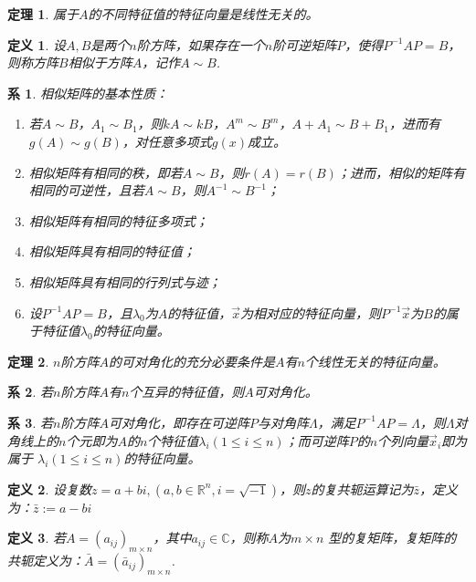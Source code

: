 \documentclass[a4paper]{book}
\newtheorem{Def}{定义}[chapter]
\newtheorem{cor}{系}[chapter]
\newtheorem{thm}{定理}[chapter]
\begin{document}
\begin{thm}
属于$A$的不同特征值的特征向量是线性无关的。
\end{thm}

\begin{Def}
设$A,B$是两个$n$阶方阵，如果存在一个$n$阶可逆矩阵$P$，使得$P^{-1}AP=B$，
则称方阵$B$相似于方阵$A$，记作$A\sim B$.
\end{Def}

\begin{cor}
相似矩阵的基本性质：
\begin{enumerate}
  \item 若$A\sim B$，$A_1\sim B_1$，则$kA\sim kB$，$A^m\sim B^m$，$A+A_1\sim B+B_1$，进而有$g(A)\sim g(B)$，对任意多项式$g(x)$成立。
  \item 相似矩阵有相同的秩，即若$A\sim B$，则$r(A)=r(B)$；进而，相似的矩阵有
  相同的可逆性，且若$A\sim B$，则$A^{-1}\sim B^{-1}$；
  \item 相似矩阵有相同的特征多项式；
  \item 相似矩阵具有相同的特征值；
  \item 相似矩阵具有相同的行列式与迹；
  \item 设$P^{-1}AP=B$，且$\lambda_0$为$A$的特征值，$\vec{x}$为相对应的特征向量，则$P^{-1}\vec{x}$为$B$的属于特征值$\lambda_0$的特征向量。
\end{enumerate}
\end{cor}

\begin{thm}
$n$阶方阵$A$的可对角化的充分必要条件是$A$有$n$个线性无关的特征向量。
\end{thm}

\begin{cor}
若$n$阶方阵$A$有$n$个互异的特征值，则$A$可对角化。
\end{cor}

\begin{cor}
若$n$阶方阵$A$可对角化，即存在可逆阵$P$与对角阵$\Lambda$，满足$P^{-1}AP=\Lambda$，则$\Lambda$对角线上的$n$个元即为$A$的$n$个特征值$\lambda_i(1\leq i\leq n)$；而可逆阵$P$的$n$个列向量$\vec{x}_i$即为属于
$\lambda_i(1\leq i\leq n)$的特征向量。
\end{cor}

\begin{Def}
设复数$z=a+bi,(a,b\in\mathbb{R}^n,i=\sqrt{-1})$，则$z$的复共轭运算记为$\bar{z}$，定义为：$\bar{z}:=a-bi$
\end{Def}

\begin{Def}
若$A=(a_{ij})_{m\times n}$，其中$a_{ij}\in\mathbb{C}$，则称$A$为$m\times n$ 型的复矩阵，复矩阵的共轭定义为：$\bar{A}=(\bar{a}_{ij})_{m\times n}$.
\end{Def}
\end{document}
